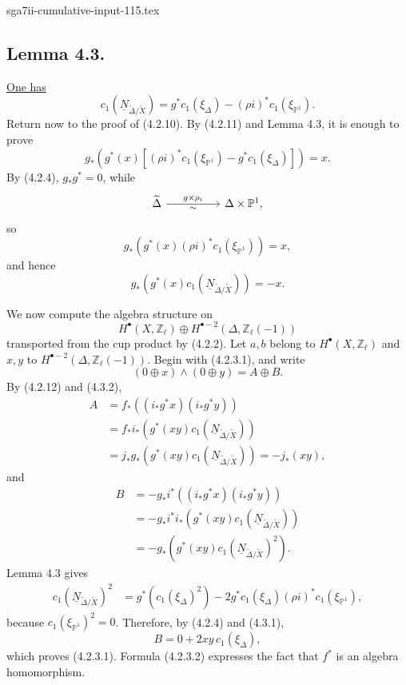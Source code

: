 \begin{filecontents*}{sga7ii-cumulative-input-115.tex}
\subsection*{Lemma 4.3.}
\underline{One has}
\[
c_1(\underline N_{\widetilde\Delta/\widetilde X})
=g^*c_1(\xi_\Delta)-(\rho i)^*c_1(\xi_{\mathbb P^1}).
\]
Return now to the proof of (4.2.10).  By (4.2.11) and Lemma 4.3, it is enough
to prove
\[
g_*\!\left(g^*(x)\left[(\rho i)^*c_1(\xi_{\mathbb P^1})
                       -g^*c_1(\xi_\Delta)\right]\right)=x.
\]
By (4.2.4), $g_*g^*=0$, while
\[
\begin{tikzcd}[column sep=huge]
\widetilde\Delta\arrow[r,"g\times\rho_i","\sim"']
  &\Delta\times\mathbb P^1,
\end{tikzcd}
\]
so
\begin{equation}\tag{4.3.1}
g_*\!\left(g^*(x)(\rho i)^*c_1(\xi_{\mathbb P^1})\right)=x,
\end{equation}
and hence
\begin{equation}\tag{4.3.2}
g_*\!\left(g^*(x)c_1(\underline N_{\widetilde\Delta/\widetilde X})\right)
=-x.
\end{equation}

We now compute the algebra structure on
\[
H^\bullet(X,\mathbb Z_\ell)\oplus
H^{\bullet-2}(\Delta,\mathbb Z_\ell(-1))
\]
transported from the cup product by (4.2.2).  Let $a,b$ belong to
$H^\bullet(X,\mathbb Z_\ell)$ and $x,y$ to
$H^{\bullet-2}(\Delta,\mathbb Z_\ell(-1))$.  Begin with (4.2.3.1), and write
\[
(0\oplus x)\wedge(0\oplus y)=A\oplus B.
\]
By (4.2.12) and (4.3.2),
\[
\begin{aligned}
A
&=f_*\!\left((i_*g^*x)(i_*g^*y)\right)\\
&=f_*i_*\!\left(g^*(xy)c_1(\underline N_{\widetilde\Delta/\widetilde X})\right)\\
&=j_*g_*\!\left(g^*(xy)c_1(\underline N_{\widetilde\Delta/\widetilde X})\right)
=-j_*(xy),
\end{aligned}
\]
and
\[
\begin{aligned}
B
&=-g_*i^*\!\left((i_*g^*x)(i_*g^*y)\right)\\
&=-g_*i^*i_*\!\left(g^*(xy)c_1(\underline N_{\widetilde\Delta/\widetilde X})\right)\\
&=-g_*\!\left(g^*(xy)c_1(\underline N_{\widetilde\Delta/\widetilde X})^2\right).
\end{aligned}
\]
Lemma 4.3 gives
\[
\begin{aligned}
c_1(\underline N_{\widetilde\Delta/\widetilde X})^2
&=g^*\!\left(c_1(\xi_\Delta)^2\right)
 -2g^*c_1(\xi_\Delta)(\rho i)^*c_1(\xi_{\mathbb P^1}),
\end{aligned}
\]
because $c_1(\xi_{\mathbb P^1})^2=0$.  Therefore, by (4.2.4) and (4.3.1),
\[
B=0+2xy\,c_1(\xi_\Delta),
\]
which proves (4.2.3.1).  Formula (4.2.3.2) expresses the fact that $f^*$ is
an algebra homomorphism.


\end{filecontents*}
